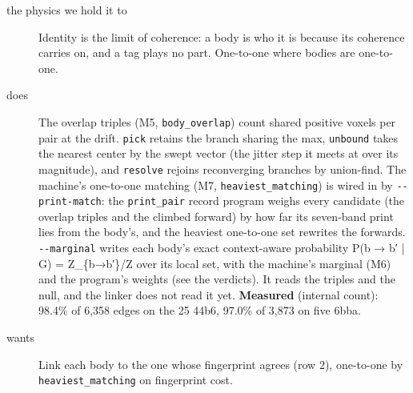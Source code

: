 \begin{description}
\item[{the physics we hold it to}] Identity is the limit of coherence: a body is who it is because its coherence carries on, and a tag plays no part. One-to-one where bodies are one-to-one.
\item[{does}] The overlap triples (M5, \texttt{body\_\allowbreak{}overlap}) count shared positive voxels per pair at the drift. \texttt{pick} retains the branch sharing the max, \texttt{unbound} takes the nearest center by the swept vector (the jitter step it meets at over its magnitude), and \texttt{resolve} rejoins reconverging branches by union-find. The machine's one-to-one matching (M7, \texttt{heaviest\_\allowbreak{}matching}) is wired in by \texttt{-\allowbreak{}-\allowbreak{}print-\allowbreak{}match}: the \texttt{print\_\allowbreak{}pair} record program weighs every candidate (the overlap triples and the climbed forward) by how far its seven-band print lies from the body's, and the heaviest one-to-one set rewrites the forwards. \texttt{-\allowbreak{}-\allowbreak{}marginal} writes each body's exact context-aware probability P(b → b′ | G) = Z\_\allowbreak{}\{b→b′\}/Z over its local set, with the machine's marginal (M6) and the program's weights (see the verdicts). It reads the triples and the null, and the linker does not read it yet. \textbf{Measured} (internal count): 98.4\% of 6,358 edges on the 25 44b6, 97.0\% of 3,873 on five 6bba.
\item[{wants}] Link each body to the one whose fingerprint agrees (row 2), one-to-one by \texttt{heaviest\_\allowbreak{}matching} on fingerprint cost.

\end{description}

